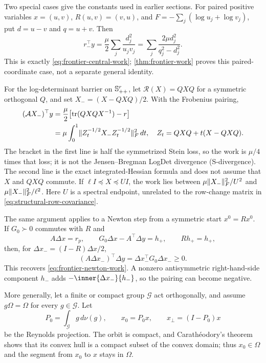Two special cases give the constants used in earlier sections.  For paired positive
variables $x=(u,v)$, $R(u,v)=(v,u)$, and
$F=-\sum_j(\log u_j+\log v_j)$, put $d=u-v$ and $q=u+v$.  Then
\begin{equation}
 r_-^\top y=\frac{\mu}{2}\sum_j\frac{d_j^2}{u_jv_j}
       =\sum_j\frac{2\mu d_j^2}{q_j^2-d_j^2}.             \label{eq:structural-paired-log}
\end{equation}
This is exactly \eqref{eq:frontier-central-work}; \cref{thm:frontier-work}
proves this paired-coordinate case, not a separate general identity.

For the log-determinant barrier on $\mathbb{S}_{++}^r$, let
$\mathcal R(X)=QXQ$ for a symmetric orthogonal $Q$, and set
$X_-=(X-QXQ)/2$.  With the Frobenius pairing,
\begin{align}
 (\mathcal A X_-)^\top y
 &=\frac{\mu}{2}\bigl[\operatorname{tr}(QXQX^{-1})-r\bigr]              \label{eq:structural-stein}\\
 &=\mu\int_0^1
 \lVert Z_t^{-1/2}X_-Z_t^{-1/2}\rVert_F^2\,dt,
 \quad Z_t=QXQ+t(X-QXQ).                                  \label{eq:structural-logdet-integral}
\end{align}
The bracket in the first line is half the symmetrized Stein loss, so the
work is $\mu/4$ times that loss; it is not the Jensen--Bregman LogDet
divergence (S-divergence).  The second line is the exact integrated-Hessian
formula and does not assume that $X$ and $QXQ$ commute.  If $\ell I\preceq X\preceq UI$, the work lies between
$\mu\lVert X_-\rVert_F^2/U^2$ and $\mu\lVert X_-\rVert_F^2/\ell^2$.
Here $U$ is a spectral endpoint, unrelated to the row-change matrix in
\eqref{eq:structural-row-covariance}.

The same argument applies to a Newton step from a symmetric start
$x^0=Rx^0$.  If $G_0\succ0$ commutes with $R$ and
\begin{equation}
 A\Delta x=r_p,\qquad G_0\Delta x-A^\top\Delta y=h_+,
 \qquad Rh_+=h_+,
\end{equation}
then, for $\Delta x_-=(I-R)\Delta x/2$,
\begin{equation}
 \boxed{(A\Delta x_-)^\top\Delta y
 =\Delta x_-^\top G_0\Delta x_-\geq0.}                       \label{eq:structural-newton-work}
\end{equation}
This recovers \eqref{eq:frontier-newton-work}.  A nonzero antisymmetric
right-hand-side component $h_-$ adds $-\inner{\Delta x_-}{h_-}$, so the
pairing can become negative.

More generally, let a finite or compact group
$\mathcal G$ act orthogonally, and assume $g\Omega=\Omega$ for every
$g\in\mathcal G$.  Let
\begin{equation}
 P_0=\int_{\mathcal G}g\,d\nu(g),\qquad
 x_0=P_0x,\qquad x_\perp=(I-P_0)x                       \label{eq:structural-reynolds}
\end{equation}
be the Reynolds projection.  The orbit is compact, and Carath\'eodory's
theorem shows that its convex hull is a compact subset of the convex domain;
thus $x_0\in\Omega$ and the segment from $x_0$ to $x$ stays in $\Omega$.

